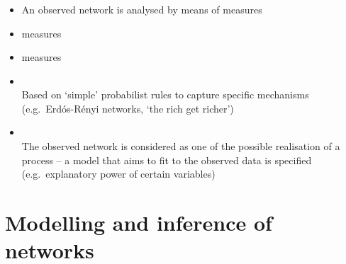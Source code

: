 \documentclass[8pt]{beamer}
\begin{document}
\begin{frame}
\frametitle{\insertsection}

{\color{blue}{Descriptive network analysis}}
    \begin{itemize}
    \item An observed network is analysed by means of measures
    \item {\color{blue}{Network-level}} measures
    \item {\color{blue}{Node-level}} measures
    \end{itemize}

\bigskip
	
{\color{blue}{Modelling and inference of networks}}
    \begin{itemize}
    \item {\color{blue}{Mathematical models}}\\
    Based on `simple' probabilist rules to capture specific mechanisms (e.g.\ Erd\'os-R\'enyi networks, `the rich get richer')		
    \item {\color{blue}{Statistical models}}\\ 
    The observed network is considered as one of the possible realisation of a process -- a model that aims to fit to the observed data is specified (e.g.\ explanatory power of certain variables)
    \end{itemize}


\end{frame}




\section{Modelling and inference of networks}


\bgroup
{}
\begin{frame}[plain]{}
\begin{center}
\color{white}{\Huge\insertsection}
\end{center}
\end{frame}
\egroup

\end{document}
